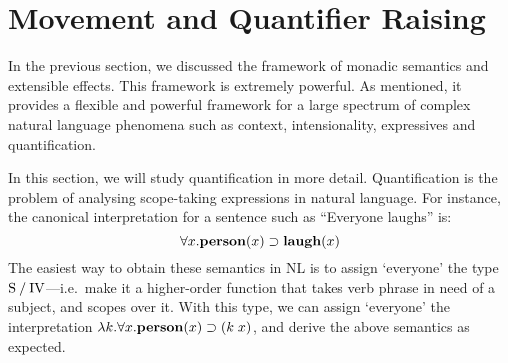 \documentclass[a4paper]{article}
\begin{document}







\section{Movement and Quantifier Raising}%
\label{sec:movement-and-quantifier-raising}

In the previous section, we discussed the framework of monadic
semantics and extensible effects. This framework is extremely
powerful. As mentioned, it provides a flexible and powerful framework
for a large spectrum of complex natural language phenomena such as
context, intensionality, expressives and quantification.

In this section, we will study quantification in more detail.
Quantification is the problem of analysing scope-taking expressions in
natural language. For instance, the canonical interpretation for a
sentence such as ``Everyone laughs'' is:
\[
  \forall{x}.\mathbf{person}(x)\supset\mathbf{laugh}(x)
\]
The easiest way to obtain these semantics in NL is to assign
`everyone' the type $\text{S}\mathbin{\slash}\text{IV}$---i.e.\ make it a higher-order
function that takes verb phrase in need of a subject, and scopes over
it. With this type, we can assign `everyone' the interpretation
$\lambda{k}.\forall{x}.\mathbf{person}(x)\supset(k\;x)$, and derive the above
semantics as expected.
\end{document}

